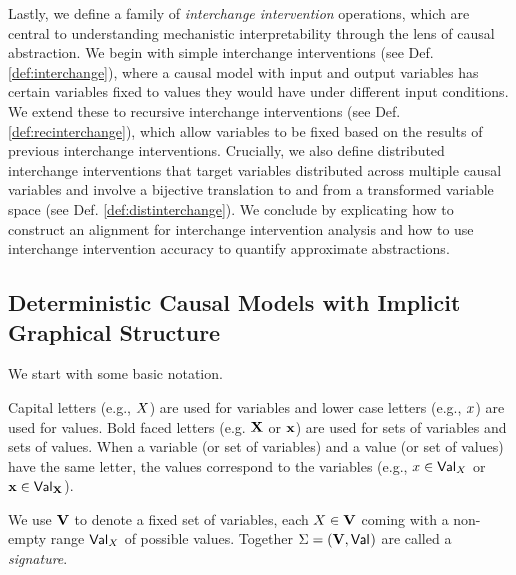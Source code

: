 \documentclass[twoside,11pt]{article}
\begin{document}
Lastly, we define a family of \emph{interchange intervention} operations, which are central to understanding mechanistic interpretability through the lens of causal abstraction. We begin with simple interchange interventions (see Def. \ref{def:interchange}), where a causal model with input and output variables has certain variables fixed to values they would have under different input conditions. We extend these to recursive interchange interventions (see Def. \ref{def:recinterchange}), which allow variables to be fixed based on the results of previous interchange interventions. Crucially, we also define distributed interchange interventions that target variables distributed across multiple causal variables and involve a bijective translation to and from a transformed variable space (see Def. \ref{def:distinterchange}). We conclude by explicating how to construct an alignment for interchange intervention analysis and how to use interchange intervention accuracy to quantify approximate abstractions.


\subsection{Deterministic Causal Models with Implicit Graphical Structure}
We start with some basic notation. 
\begin{remark}\label{rem:notation}

Capital letters (e.g., $X$) are used for variables and lower case letters (e.g., $x$) are used for values. Bold faced letters (e.g. $\mathbf{X}$ or $\mathbf{x}$) are used for sets of variables and sets of values. %
When a variable (or set of variables) and a value (or set of values) have the same letter, the values correspond to the variables (e.g., $x \in \mathsf{Val}_{X}$ or $\mathbf{x} \in \mathsf{Val}_{\mathbf{X}}$).
\end{remark}

\begin{definition}[Signature]\label{def:signature} We use $\mathbf{V}$ to denote a fixed set of variables, each $X \in \mathbf{V}$ coming with a non-empty range $\mathsf{Val}_{X}$ of possible values. 
Together $\Sigma = (\mathbf{V} ,\mathsf{Val}_{})$ are called a \emph{signature}. 
\end{definition} 
\end{document}
